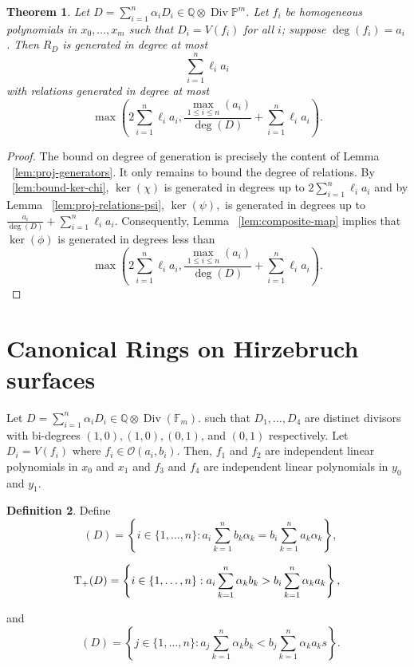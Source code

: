 \documentclass{amsart}
\theoremstyle{plain}
\newtheorem{thm}{Theorem}[section]
\theoremstyle{definition}
\newtheorem{defn}[thm]{Definition}
\theoremstyle{remark}
\numberwithin{equation}{section}
\newcommand\bq{{\mathbb Q}}
\newcommand\bp{{\mathbb P}}
\newcommand\sco{{\mathscr O}}
\DeclareMathOperator\di{Div}
\newcommand\bida{a}
\newcommand\bidb{b}
\newcommand\hirz{\mathbb{F}}
\DeclareMathOperator{\Te}{T_=}
\DeclareMathOperator{\Tp}{T_+}
\DeclareMathOperator{\Tm}{T_-}
\begin{document}
\begin{thm}
\label{lem:proj-generators-relations}
Let $D = \sum_{i=1}^n \alpha_i D_i \in \bq \otimes \di \bp^m$. Let $f_i$ be homogeneous polynomials in $x_0, \ldots, x_m$ such that $D_i = V(f_i)$ for all $i$; suppose $\deg(f_i) = a_i$. 
Then $R_D$ is generated in degree at most 
\[
	\sum_{i=1}^n \ell_i a_i
\]
with relations generated in degree at most
\[
	\max \left(2 \sum_{i=1}^n \ell_i a_i, \frac{\max_{1\le i \le n}(\bida_i)}{\deg(D)} + \sum_{i=1}^n \ell_i a_i \right).
\]
\end{thm}
\begin{proof}
The bound on degree of generation is precisely the content of Lemma ~\ref{lem:proj-generators}. It only remains to bound the degree of relations.
By ~\ref{lem:bound-ker-chi}, $\ker(\chi)$ is generated in degrees up to $2\sum_{i=1}^n \ell_i a_i$ and by Lemma ~\ref{lem:proj-relations-psi}, $\ker(\psi),$ is generated in degrees up to $\frac{\bida_i}{\deg(D)} + \sum_{i=1}^n \ell_i a_i.$ Consequently, Lemma ~\ref{lem:composite-map} implies that $\ker(\phi)$ is generated in degrees less than
\[
	\max \left(2 \sum_{i=1}^n \ell_i a_i, \frac{\max_{1\le i \le n}(\bida_i)}{\deg(D)} + \sum_{i=1}^n \ell_i a_i \right).
\]
\end{proof}

\section{Canonical Rings on Hirzebruch surfaces}
\label{sec:hirz}
Let $D=\sum_{i=1}^n \alpha_i D_i \in \mathbb{Q} \otimes \di(\hirz_
m).$ such
that $D_1, \ldots, D_4$ are distinct divisors with bi-degrees $(1,0)
, (1,0), (0,1)$, and $(0,1)$ respectively. Let $D_i = V(f_i)$ where
$f_i \in \sco(\bida_i, \bidb_i)$.  
Then, $f_1$ and $f_2$ are independent linear
polynomials in $x_0$ and $x_1$ and $f_3$ and $f_4$ are independent
linear polynomials in $y_0$ and $y_1$. 

\begin{defn}
Define 
\begin{equation}
\label{eqn:define-T=(D)}
	\Te(D) = \left\{i \in \{1, \ldots, n\}: \bida_i \sum_{k=1}^n \bidb_k 
\alpha_k = \bidb_i \sum_{k=1}^n \bida_k \alpha_k \right\},
\end{equation}

\begin{equation}
\label{eqn:define-T+(D)}
	\Tp(D) = \left\{ i \in \{1, \ldots, n\}:  \vphantom{\sum_{k = 1}^n} 
	\bida_i \sum_{k = 1}^n \alpha_k \bidb_k > \bidb_i \sum_{k = 1}^n \alpha_k \bida_k 
\right\},
\end{equation}

\noindent
and
\begin{equation}
\label{eqn:define-T-(D)}
	\Tm(D) = \left\{ j \in \{1, \ldots, n\}: \bida_j \sum_{k = 1}^n \alpha_k
	\bidb_k < \bidb_j \sum_{k=1}^n \alpha_k \bida_k s \right\}.
\end{equation}
\end{defn}
\end{document}
